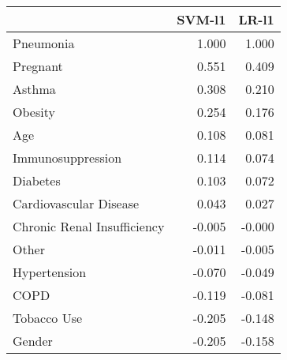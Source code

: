 \begin{tabular}{lrr}
\toprule
{} &  SVM-l1 &  LR-l1 \\
\midrule
Pneumonia                   &   1.000 &  1.000 \\
Pregnant                    &   0.551 &  0.409 \\
Asthma                      &   0.308 &  0.210 \\
Obesity                     &   0.254 &  0.176 \\
Age                         &   0.108 &  0.081 \\
Immunosuppression           &   0.114 &  0.074 \\
Diabetes                    &   0.103 &  0.072 \\
Cardiovascular Disease      &   0.043 &  0.027 \\
Chronic Renal Insufficiency &  -0.005 & -0.000 \\
Other                       &  -0.011 & -0.005 \\
Hypertension                &  -0.070 & -0.049 \\
COPD                        &  -0.119 & -0.081 \\
Tobacco Use                 &  -0.205 & -0.148 \\
Gender                      &  -0.205 & -0.158 \\
\bottomrule
\end{tabular}
